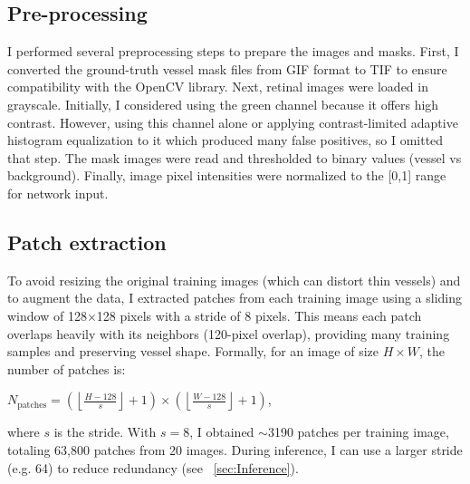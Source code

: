 \documentclass[11pt]{article}
\begin{document}
\subsection{Pre-processing}
\label{sec:Preprocess}

I performed several preprocessing steps to prepare the images and masks. First, I converted the ground-truth vessel mask files from GIF format to TIF to ensure compatibility with the OpenCV library. Next, retinal images were loaded in grayscale. Initially, I considered using the green channel
because it offers high contrast. However, using this channel alone or applying contrast-limited
adaptive histogram equalization to it which produced many false positives, so I omitted that step.
 The mask images were read and thresholded to binary values (vessel vs background). Finally, image pixel intensities were normalized to the [0,1] range for network input.

\subsection{Patch extraction}
\label{sec:PatchExtract}

To avoid resizing the original training images (which can distort thin vessels) and to augment the data, I extracted patches from each training image using a sliding window of 128×128 pixels with a stride of 8 pixels. This means each patch overlaps heavily with its neighbors (120-pixel overlap), providing many training samples and preserving vessel shape. Formally, for an image of size $H\times W$, the number of patches is:

$N_{\text{patches}} = \left(\left\lfloor\frac{H-128}{s}\right\rfloor+1\right)\times \left(\left\lfloor\frac{W-128}{s}\right\rfloor+1\right)$,

where $s$ is the stride. With $s=8$, I obtained $\sim$3190 patches per training image, totaling 63,800 patches from 20 images. During inference, I can use a larger stride (e.g. 64) to reduce redundancy (see ~\ref{sec:Inference}).
\end{document}
